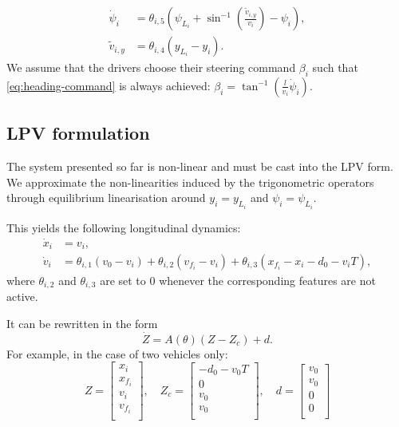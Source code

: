\documentclass{article}
\begin{document}
\begin{align}
	\label{eq:heading-command}
    \dot{\psi}_i &= \theta_{i,5}\left(\psi_{L_i}+\sin^{-1}\left(\frac{\tilde{v}_{i,y}}{v_i}\right)-\psi_i\right),\\
    \tilde{v}_{i,y} &= \theta_{i,4} (y_{L_i}-y_i). \nonumber
\end{align}
We assume that the drivers choose their steering command $\beta_i$ such that \eqref{eq:heading-command} is always achieved: $\beta_i = \tan^{-1}(\frac{l}{v_i}\dot{\psi}_i)$.

\subsection{LPV formulation}

The system presented so far is non-linear and must be cast into the LPV form. We approximate the non-linearities induced by the trigonometric operators through equilibrium linearisation around $y_i=y_{L_i}$ and $\psi_i=\psi_{L_i}$.

This yields the following longitudinal dynamics:
\begin{align*}
\dot{x}_i &= v_i,\\
\dot v_i &= \theta_{i,1} (v_0 - v_i) + \theta_{i,2} (v_{f_i} - v_i) + \theta_{i,3}(x_{f_i} - x_i - d_0 - v_i T),
\end{align*}
where $\theta_{i,2}$ and $\theta_{i,3}$ are set to $0$ whenever the corresponding features are not active.

It can be rewritten in the form $$\dot{Z} = A(\theta)(Z-Z_c) + d.$$ For example, in the case of two vehicles only:
\begin{equation*}
    Z = \begin{bmatrix}
x_i \\
x_{f_i} \\
v_i \\
v_{f_i} \\
\end{bmatrix}
,\quad
Z_c = \begin{bmatrix}
-d_0-v_0 T \\
0 \\
v_0\\
v_0 \\
\end{bmatrix}
,\quad
d = \begin{bmatrix}
v_0 \\
v_0 \\
0\\
0\\
\end{bmatrix}
\end{equation*}
\end{document}

